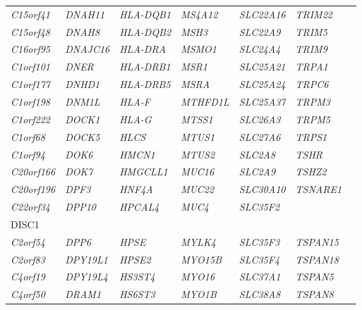 \begin{refsection}
\begin{otherlanguage}{english}
\begin{scriptsize}
\begin{longtable}{lllllll}
\textit{C15orf41} & \textit{DNAH11} & \textit{HLA-DQB1} & \textit{MS4A12} & \textit{SLC22A16} & \textit{TRIM22} & \textit{} \\
\textit{C15orf48} & \textit{DNAH8} & \textit{HLA-DQB2} & \textit{MSH3} & \textit{SLC22A9} & \textit{TRIM5} & \textit{} \\
\textit{C16orf95} & \textit{DNAJC16} & \textit{HLA-DRA} & \textit{MSMO1} & \textit{SLC24A4} & \textit{TRIM9} & \textit{} \\
\textit{C1orf101} & \textit{DNER} & \textit{HLA-DRB1} & \textit{MSR1} & \textit{SLC25A21} & \textit{TRPA1} & \textit{} \\
\textit{C1orf177} & \textit{DNHD1} & \textit{HLA-DRB5} & \textit{MSRA} & \textit{SLC25A24} & \textit{TRPC6} & \textit{} \\
\textit{C1orf198} & \textit{DNM1L} & \textit{HLA-F} & \textit{MTHFD1L} & \textit{SLC25A37} & \textit{TRPM3} & \textit{} \\
\textit{C1orf222} & \textit{DOCK1} & \textit{HLA-G} & \textit{MTSS1} & \textit{SLC26A3} & \textit{TRPM5} & \textit{} \\
\textit{C1orf68} & \textit{DOCK5} & \textit{HLCS} & \textit{MTUS1} & \textit{SLC27A6} & \textit{TRPS1} & \textit{} \\
\textit{C1orf94} & \textit{DOK6} & \textit{HMCN1} & \textit{MTUS2} & \textit{SLC2A8} & \textit{TSHR} & \textit{} \\
\textit{C20orf166} & \textit{DOK7} & \textit{HMGCLL1} & \textit{MUC16} & \textit{SLC2A9} & \textit{TSHZ2} & \textit{} \\
\textit{C20orf196} & \textit{DPF3} & \textit{HNF4A} & \textit{MUC22} & \textit{SLC30A10} & \textit{TSNARE1} & \textit{} \\
\textit{C22orf34} & \textit{DPP10} & \textit{HPCAL4} & \textit{MUC4} & \textit{SLC35F2} & \textit{\begin{tabular}[c]{@{}l@{}}TSNAX-\\ DISC1\end{tabular}} & \textit{} \\
\textit{C2orf54} & \textit{DPP6} & \textit{HPSE} & \textit{MYLK4} & \textit{SLC35F3} & \textit{TSPAN15} & \textit{} \\
\textit{C2orf83} & \textit{DPY19L1} & \textit{HPSE2} & \textit{MYO15B} & \textit{SLC35F4} & \textit{TSPAN18} & \textit{} \\
\textit{C4orf19} & \textit{DPY19L4} & \textit{HS3ST4} & \textit{MYO16} & \textit{SLC37A1} & \textit{TSPAN5} & \textit{} \\
\textit{C4orf50} & \textit{DRAM1} & \textit{HS6ST3} & \textit{MYO1B} & \textit{SLC38A8} & \textit{TSPAN8} & \textit{} \\

\end{longtable}
\end{scriptsize}
\end{otherlanguage}
\end{refsection}
